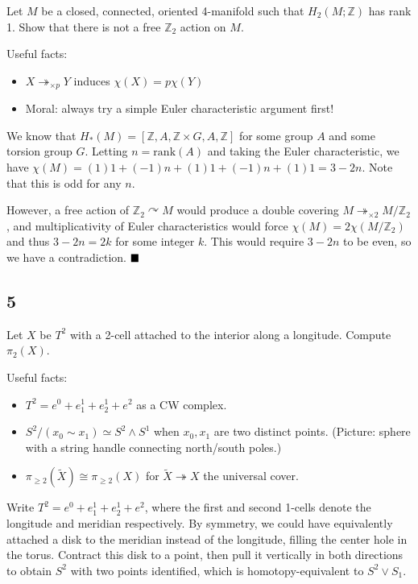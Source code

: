 Let \(M\) be a closed, connected, oriented 4-manifold such that
\(H_2(M; {\mathbb{Z}})\) has rank 1. Show that there is not a free
\({\mathbb{Z}}_2\) action on \(M\).

Useful facts:

\begin{itemize}
\tightlist
\item
  \(X \twoheadrightarrow_{\times p} Y\) induces \(\chi(X) = p\chi(Y)\)
\item
  Moral: always try a simple Euler characteristic argument first!
\end{itemize}

We know that
\(H_*(M) = [{\mathbb{Z}}, A, {\mathbb{Z}}\times G, A, {\mathbb{Z}}]\)
for some group \(A\) and some torsion group \(G\). Letting
\(n=\mathrm{rank}(A)\) and taking the Euler characteristic, we have
\(\chi(M) = (1)1 + (-1)n + (1)1 + (-1)n + (1)1 = 3-2n\). Note that this
is odd for any \(n\).

However, a free action of \({\mathbb{Z}}_2 \curvearrowright M\) would
produce a double covering
\(M \twoheadrightarrow_{\times 2} M/{\mathbb{Z}}_2\), and
multiplicativity of Euler characteristics would force
\(\chi(M) = 2 \chi(M/{\mathbb{Z}}_2)\) and thus \(3-2n = 2k\) for some
integer \(k\). This would require \(3-2n\) to be even, so we have a
contradiction. \(\hfill\blacksquare\)

\hypertarget{section-4}{%
\subsection{5}\label{section-4}}

Let \(X\) be \(T^2\) with a 2-cell attached to the interior along a
longitude. Compute \(\pi_2(X)\).

Useful facts:

\begin{itemize}
\tightlist
\item
  \(T^2 = e^0 + e^1_1 + e^1_2 + e^2\) as a CW complex.
\item
  \(S^2/(x_0 \sim x_1) \simeq S^2 \wedge S^1\) when \(x_0, x_1\) are two
  distinct points. (Picture: sphere with a string handle connecting
  north/south poles.)
\item
  \(\pi_{\geq 2}(\tilde X) \cong \pi_{\geq 2}(X)\) for
  \(\tilde X \twoheadrightarrow X\) the universal cover.
\end{itemize}

Write \(T^2 = e^0 + e^1_1 + e^1_2 + e^2\), where the first and second
1-cells denote the longitude and meridian respectively. By symmetry, we
could have equivalently attached a disk to the meridian instead of the
longitude, filling the center hole in the torus. Contract this disk to a
point, then pull it vertically in both directions to obtain \(S^2\) with
two points identified, which is homotopy-equivalent to \(S^2 \vee S_1\).

